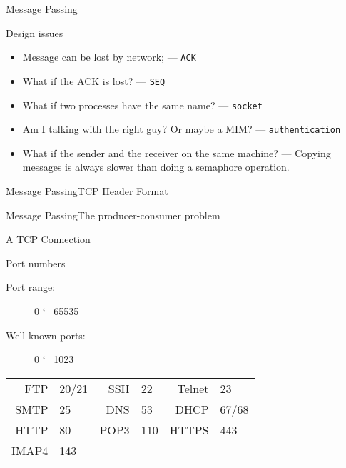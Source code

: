 \begin{frame}{Message Passing}
  \begin{block}{Design issues}
    \begin{itemize}
    \item Message can be lost by network; --- \texttt{ACK}
    \item What if the ACK is lost? --- \texttt{SEQ}
    \item What if two processes have the same name? --- \texttt{socket}
    \item Am I talking with the right guy? Or maybe a MIM? --- \texttt{authentication}
    \item What if the sender and the receiver on the same machine? --- Copying messages is
      always slower than doing a semaphore operation.
    \end{itemize}
  \end{block}
\end{frame}

\begin{frame}{Message Passing}{TCP Header Format}
  \begin{center}
  \end{center}
\end{frame}

\begin{frame}{Message Passing}{The producer-consumer problem}
  \begin{center}
  \end{center}
\end{frame}

\begin{frame}{A TCP Connection}
  \begin{center}
  \end{center}
  \begin{block}{Port numbers}
    \begin{description}
    \item[Port range:] 0 \char`~{} 65535
    \item[Well-known ports:] 0 \char`~{} 1023
    \end{description}
    \begin{center}
      \begin{tabular}{rl|rl|rl}
        FTP &20/21&SSH&22&Telnet&23\\
        SMTP&25 &DNS&53&DHCP &67/68\\
        HTTP&80 &POP3&110&HTTPS&443\\
        IMAP4&143&&&&
      \end{tabular}
    \end{center}
  \end{block}
\end{frame}


